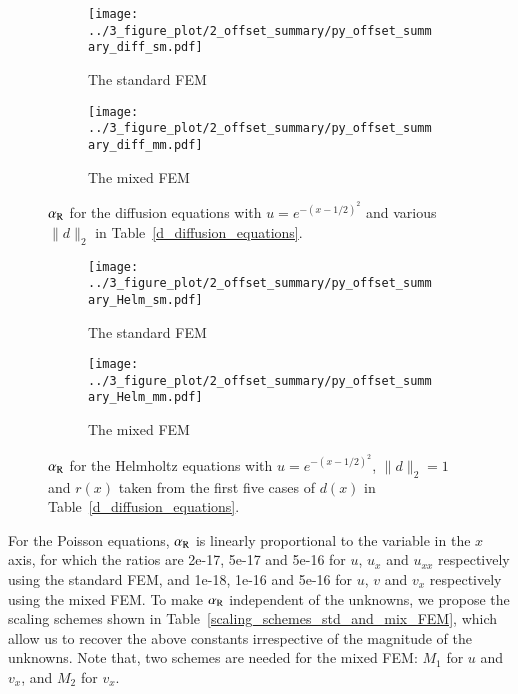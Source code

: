 \documentclass[review,3p]{elsarticle}
\begin{document}
\begin{figure}[!ht]
	\centering
    \begin{subfigure}{6.0cm}
        \texttt{[image: ../3\_figure\_plot/2\_offset\_summary/py\_offset\_summary\_diff\_sm.pdf]}
        \caption{The standard FEM}
        \label{py_offset_summary_diff_sm}
    \end{subfigure}
    \hspace{-0.2cm}
    \begin{subfigure}{6.0cm}
        \texttt{[image: ../3\_figure\_plot/2\_offset\_summary/py\_offset\_summary\_diff\_mm.pdf]}
        \caption{The mixed FEM}
        \label{py_offset_summary_diff_mm}
    \end{subfigure}
\caption{$\alpha_{\rm R}$ for the diffusion equations with $u=e^{-{(x-1/2)^2}}$ and various $\|d\|_2$ in Table~\ref{d_diffusion_equations}.}
\label{py_offset_summary_diff}
\end{figure}

\begin{figure}[!ht]
	\centering
    \begin{subfigure}{6.0cm}
        \texttt{[image: ../3\_figure\_plot/2\_offset\_summary/py\_offset\_summary\_Helm\_sm.pdf]}
        \caption{The standard FEM}
        \label{py_offset_summary_Helm_sm}
    \end{subfigure}
    \hspace{-0.2cm}
    \begin{subfigure}{6.0cm}
        \texttt{[image: ../3\_figure\_plot/2\_offset\_summary/py\_offset\_summary\_Helm\_mm.pdf]}
        \caption{The mixed FEM}
        \label{py_offset_summary_Helm_mm}
    \end{subfigure}
\caption{$\alpha_{\rm R}$ for the Helmholtz equations with $u=e^{-{(x-1/2)^2}}$, $\|d\|_2=1$ and $r(x)$ taken from the first five cases of $d(x)$ in Table~\ref{d_diffusion_equations}.}
\label{py_offset_summary_Helm}
\end{figure}

For the Poisson equations, $\alpha_{\rm R}$ is linearly proportional to the variable in the $x$ axis, for which the ratios are 2e-17, 5e-17 and 5e-16 for $u$, $u_x$ and $u_{xx}$ respectively using the standard FEM, and 1e-18, 1e-16 and 5e-16 for $u$, $v$ and $v_{x}$ respectively using the mixed FEM. To make $\alpha_{\rm R}$ independent of the unknowns, we propose the scaling schemes shown in Table~\ref{scaling_schemes_std_and_mix_FEM}, which allow us to recover the above constants irrespective of the magnitude of the unknowns. Note that, two schemes are needed for the mixed FEM: $M_1$ for $u$ and $v_x$, and $M_2$ for $v_x$.
\end{document}
